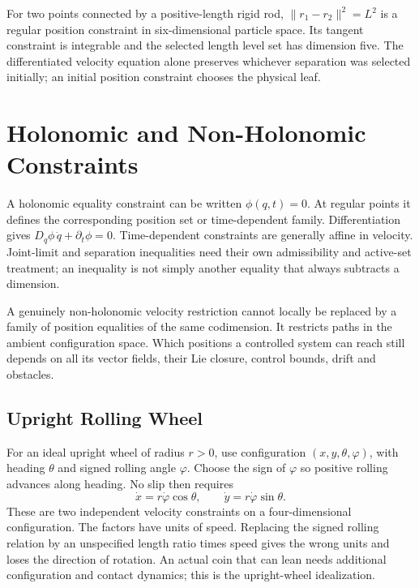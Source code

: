 For two points connected by a positive-length rigid rod, $\|r_1-r_2\|^2=L^2$ is a regular position constraint in six-dimensional particle space. Its tangent constraint is integrable and the selected length level set has dimension five. The differentiated velocity equation alone preserves whichever separation was selected initially; an initial position constraint chooses the physical leaf.

\section{Holonomic and Non-Holonomic Constraints}
\label{sec:constraints}
\label{ex:ex_car_pfaffian}
\label{def:pfaffian}
\label{ex:ex_ball_plate}
\label{ex:unicycle}
\label{ex:rolling_coin}
\label{def:nonholonomic}
\label{def:holonomic}

A holonomic equality constraint can be written $\phi(q,t)=0$. At regular points it defines the corresponding position set or time-dependent family. Differentiation gives $D_q\phi\,\dot q+\partial_t\phi=0$. Time-dependent constraints are generally affine in velocity. Joint-limit and separation inequalities need their own admissibility and active-set treatment; an inequality is not simply another equality that always subtracts a dimension.

A genuinely non-holonomic velocity restriction cannot locally be replaced by a family of position equalities of the same codimension. It restricts paths in the ambient configuration space. Which positions a controlled system can reach still depends on all its vector fields, their Lie closure, control bounds, drift and obstacles.

\subsection{Upright Rolling Wheel}

For an ideal upright wheel of radius $r>0$, use configuration $(x,y,\theta,\varphi)$, with heading $\theta$ and signed rolling angle $\varphi$. Choose the sign of $\varphi$ so positive rolling advances along heading. No slip then requires
\begin{equation}
 \dot x=r\dot\varphi\cos\theta,\qquad
 \dot y=r\dot\varphi\sin\theta.
\end{equation}
These are two independent velocity constraints on a four-dimensional configuration. The factors have units of speed. Replacing the signed rolling relation by an unspecified length ratio times speed gives the wrong units and loses the direction of rotation. An actual coin that can lean needs additional configuration and contact dynamics; this is the upright-wheel idealization.

